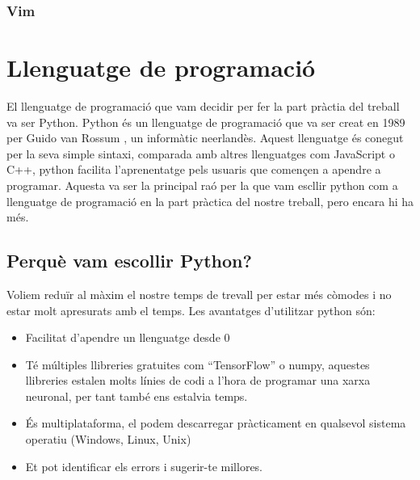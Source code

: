 \subsubsection{Vim}\label{subsubsec:Vim}

\section{Llenguatge de programació}\label{sec:4.4}

El llenguatge de programació que vam decidir per fer la part pràctia del treball va ser Python. Python és un llenguatge de programació que va ser creat en 1989 per Guido van Rossum , un informàtic neerlandès. Aquest llenguatge és conegut per la seva simple sintaxi, comparada amb altres llenguatges com JavaScript o C++, python facilita l'aprenentatge pels usuaris que començen a apendre a programar. Aquesta va ser la principal raó per la que vam escllir python com a llenguatge de programació en la part pràctica del nostre treball, pero encara hi ha més.

\subsection{Perquè vam escollir Python?}
Voliem reduïr al màxim el nostre temps de trevall per estar més còmodes i no estar molt apresurats amb el temps. Les avantatges d'utilitzar python són:
\begin{itemize}
 \item Facilitat d'apendre un llenguatge desde 0
 \item Té múltiples llibreries gratuites com ``TensorFlow'' o numpy, aquestes llibreries estalen molts línies de codi a l'hora de programar una xarxa neuronal, per tant també ens estalvia temps.
 \item És multiplataforma, el podem descarregar pràcticament en qualsevol sistema operatiu (Windows, Linux, Unix)
 \item Et pot identificar els errors i sugerir-te millores.
\end{itemize}




